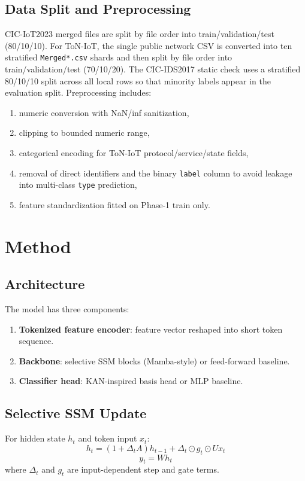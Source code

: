 \documentclass[a4paper,fleqn]{cas-dc}
\begin{document}
\subsection{Data Split and Preprocessing}
CIC-IoT2023 merged files are split by file order into train/validation/test (80/10/10). For ToN-IoT, the single public network CSV is converted into ten stratified \texttt{Merged*.csv} shards and then split by file order into train/validation/test (70/10/20). The CIC-IDS2017 static check uses a stratified 80/10/10 split across all local rows so that minority labels appear in the evaluation split. Preprocessing includes:
\begin{enumerate}
\item numeric conversion with NaN/inf sanitization,
\item clipping to bounded numeric range,
\item categorical encoding for ToN-IoT protocol/service/state fields,
\item removal of direct identifiers and the binary \texttt{label} column to avoid leakage into multi-class \texttt{type} prediction,
\item feature standardization fitted on Phase-1 train only.
\end{enumerate}

\section{Method}
\subsection{Architecture}
The model has three components:
\begin{enumerate}
\item \textbf{Tokenized feature encoder}: feature vector reshaped into short token sequence.
\item \textbf{Backbone}: selective SSM blocks (Mamba-style) or feed-forward baseline.
\item \textbf{Classifier head}: KAN-inspired basis head or MLP baseline.
\end{enumerate}

\subsection{Selective SSM Update}
For hidden state $h_t$ and token input $x_t$:
\begin{equation}
h_t = (1 + \Delta_t A)h_{t-1} + \Delta_t \odot g_t \odot Ux_t
\end{equation}
\begin{equation}
y_t = Wh_t
\end{equation}
where $\Delta_t$ and $g_t$ are input-dependent step and gate terms.
\end{document}
